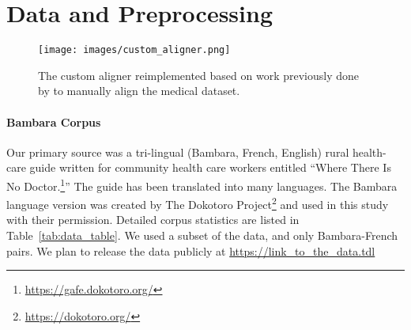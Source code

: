 \documentclass[11pt,a4paper]{article}
\begin{document}
\section{Data and Preprocessing}
\label{preprocessing}

\begin{figure}[!h]
    \centering
    \texttt{[image: images/custom\_aligner.png]}
    \caption[Custom aligner.]{The custom aligner reimplemented based on work previously done by \citet{tapo-etal-2020-neural} to manually align the medical dataset.
    }
    \label{fig:custom_aligner}
\end{figure}

\paragraph{Bambara Corpus}Our primary source was a tri-lingual (Bambara, French, English) rural health-care guide written for community health care workers entitled ``Where There Is No Doctor.\footnote{\url{https://gafe.dokotoro.org/}}'' The guide has been translated into many languages. The Bambara language version was created by The Dokotoro Project\footnote{\url{https://dokotoro.org/}} and used in this study with their permission. Detailed corpus statistics are listed in Table~\ref{tab:data_table}. We used a subset of the data, and only Bambara-French pairs. We plan to release the data publicly at \url{https://link_to_the_data.tdl}

\begin{table}[h]
\begin{center}
\end{center}
\caption[Main data-sets.]{The dataset from the medical health guide with examples in Bambara, and French.}
\label{tab:data_table}
\end{table}
\end{document}
